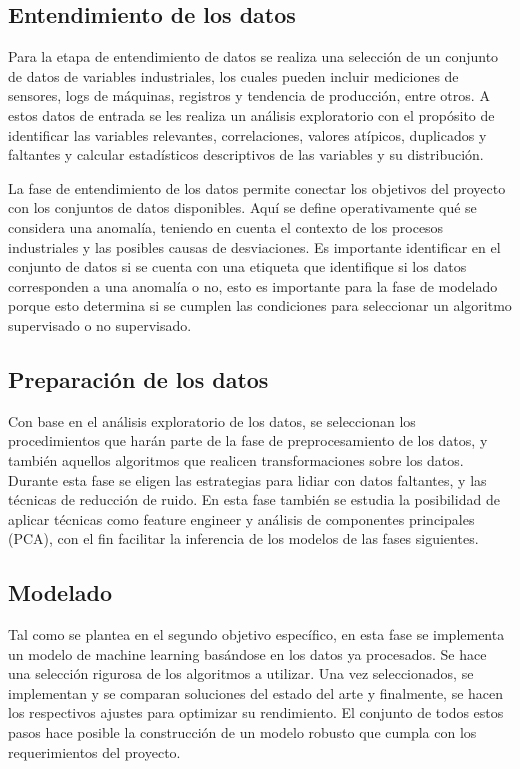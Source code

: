 \documentclass[11pt,a4paper,spanish]{book}
\numberwithin{equation}{chapter}
\numberwithin{figure}{chapter}
\begin{document}
\subsection{Entendimiento de los datos}


Para la etapa de entendimiento de datos se realiza una selección de un conjunto de datos
de variables industriales, los cuales pueden incluir mediciones de sensores, logs de 
máquinas, registros y tendencia de producción, entre otros. A estos datos de entrada se 
les realiza un análisis exploratorio con el propósito de identificar las variables 
relevantes, correlaciones, valores atípicos, duplicados y faltantes y calcular 
estadísticos descriptivos de las variables y su distribución.


La fase de entendimiento de los datos permite conectar los objetivos del proyecto con 
los conjuntos de datos disponibles. Aquí se define operativamente qué se considera una 
anomalía, teniendo en cuenta el contexto de los procesos industriales y las posibles 
causas de desviaciones. Es importante identificar en el conjunto de datos si se cuenta 
con una etiqueta que identifique si los datos corresponden a una anomalía o no, esto es 
importante para la fase de modelado porque esto determina si se cumplen las condiciones 
para seleccionar un algoritmo supervisado o no supervisado. 

\subsection{Preparación de los datos}


Con base en el análisis exploratorio de los datos, se seleccionan los procedimientos 
que harán parte de la fase de preprocesamiento de los datos, y también aquellos 
algoritmos que realicen transformaciones sobre los datos. Durante esta fase se eligen 
las estrategias para lidiar con datos faltantes, y las técnicas de reducción de ruido. 
En esta fase también se estudia la posibilidad de aplicar técnicas como feature engineer 
y análisis de componentes principales (PCA),  con el fin facilitar la inferencia de los 
modelos de las fases siguientes.


\subsection{Modelado}


Tal como se plantea en el segundo objetivo específico, en esta fase se implementa un 
modelo de machine learning basándose en los datos ya procesados. Se hace una selección 
rigurosa de los algoritmos a utilizar. Una vez seleccionados, se implementan y se 
comparan soluciones del estado del arte y finalmente, se hacen los respectivos ajustes 
para optimizar su rendimiento.
El conjunto de todos estos pasos hace posible la construcción de un modelo robusto que 
cumpla con los requerimientos del proyecto. 
\end{document}
